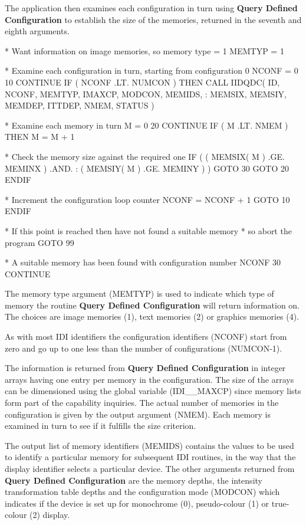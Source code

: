 \documentclass[11pt,nolof]{starlink}
\begin{document}
The application then examines each configuration in turn using
\textbf{Query Defined Configuration} to establish the size of the memories,
returned in the seventh and eighth arguments.
\begin{small}
\begin{terminalv}
*   Want information on image memories, so memory type = 1
      MEMTYP = 1

*   Examine each configuration in turn, starting from configuration 0
      NCONF = 0
  10  CONTINUE
      IF ( NCONF .LT. NUMCON ) THEN
         CALL IIDQDC( ID, NCONF, MEMTYP, IMAXCP, MODCON, MEMIDS,
     :                MEMSIX, MEMSIY, MEMDEP, ITTDEP, NMEM, STATUS )

*   Examine each memory in turn
         M = 0
  20     CONTINUE
         IF ( M .LT. NMEM ) THEN
            M = M + 1

*   Check the memory size against the required one
            IF ( ( MEMSIX( M ) .GE. MEMINX ) .AND.
     :           ( MEMSIY( M ) .GE. MEMINY ) ) GOTO 30
            GOTO 20
         ENDIF

*   Increment the configuration loop counter
         NCONF = NCONF + 1
         GOTO 10
      ENDIF

*   If this point is reached then have not found a suitable memory
*   so abort the program
      GOTO 99

*   A suitable memory has been found with configuration number NCONF
  30  CONTINUE
\end{terminalv}
\end{small}

The memory type argument (MEMTYP) is used to indicate which type of memory
the routine \textbf{Query Defined Configuration} will return information on.
The choices are image memories (1), text memories (2) or graphics
memories (4).

As with most IDI identifiers the configuration identifiers (NCONF)
start from zero and go up to one less than the number of configurations
(NUMCON-1).

The information is returned from \textbf{Query Defined Configuration} in
integer arrays having one entry per memory in the configuration. The
size of the arrays can be dimensioned using the global variable
(IDI\_\_MAXCP) since memory lists form part of the capability inquiries.
The actual number of memories in the configuration is given by the output
argument (NMEM). Each memory is examined in turn to see if it fulfills
the size criterion.

The output list of memory identifiers (MEMIDS) contains the values to
be used to identify a particular memory for subsequent IDI routines,
in the way that the display identifier selects a particular device.
The other arguments returned from \textbf{Query Defined Configuration}
are the memory depths, the intensity transformation table depths and
the configuration mode (MODCON) which indicates if the device is set
up for monochrome (0), pseudo-colour (1) or true-colour (2) display.
\end{document}
